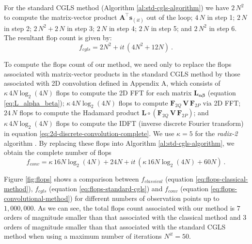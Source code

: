 \documentclass[manuscript]{geophysics}
\begin{document}
For the standard CGLS method (Algorithm \ref{al:std-cgls-algorithm}) we have $2 \, N^2$ to compute
the matrix-vector product $\mathbf{A}^{\top} \mathbf{s}_{(it)}$ out of the loop;
$4 \, N$ in step 1; $2 \, N$ in step 2; $2 \, N^2 + 2 \, N$ in step 3; $2 \, N$ in step 4;
$2 \, N$ in step 5; and $2 \, N^2$ in step 6. The resultant flop count is given by:
\begin{equation}
	f_{cgls} =  2 N^{2} + it \, (4 N^{2} + 12 N) \: .
	\label{eq:flops-standard-cgls}
\end{equation}


To compute the flops count of our method, we need only to replace the flops associated with 
matrix-vector products in the standard CGLS method by those associated with
2D convolution defined in Appendix A, which consists of $\kappa  \, 4 N \log_2(4N)$ flops to
compute the 2D FFT for each matrix $\mathbf{L}_{\boldsymbol{\alpha\beta}}$ (equation 
\ref{eq:L_alpha_beta}); $\kappa  \, 4 N \log_2(4N)$ flops to compute 
$\mathbf{F}_{2Q} \, \mathbf{V} \, \mathbf{F}_{2P}$ via 2D FFT; $24 \, N$ flops to compute the 
Hadamard product $\mathbf{L} \circ \left(\mathbf{F}_{2Q} \, \mathbf{V} \, \mathbf{F}_{2P} \right)$; 
and $\kappa  \, 4 N \log_2(4N)$ flops to compute the IDFT (inverse discrete Fourier transform) in equation 
\ref{eq:2d-discrete-convolution-complete}. We use $\kappa = 5$ for the \emph{radix-2} algorithm
\citep[][ p.~15]{vanloan1992}. By replacing these flops into Algorithm \ref{al:std-cgls-algorithm},
we obtain the complete number of flops
\begin{equation}
	f_{conv} =  \kappa  \, 16 N \log_2(4 N) + 24 N + it \, (\kappa  \, 16 N \log_2 (4 N) + 60 N) \: .
	\label{eq:flops-convolutional-method}
\end{equation}

Figure \ref{fig:flops} shows a comparison between 
$f_{classical}$ (equation \ref{eq:flops-classical-method}), 
$f_{cgls}$ (equation \ref{eq:flops-standard-cgls}) and 
$f_{conv}$ (equation \ref{eq:flops-convolutional-method})
for different numbers of observation points up to $1,000,000$. As we can see, 
the total flops count associated with our method is $7$ orders of magnitude smaller 
than that associated with the classical method and $3$ orders of magnitude smaller than
that associated with the standard CGLS method when using a maximum number
of iterations $N^{it} = 50$. 
\end{document}
